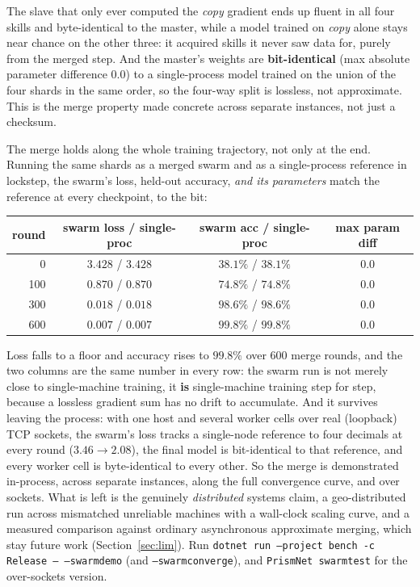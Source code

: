 \documentclass[11pt]{article}
\newcommand{\code}[1]{\texttt{#1}}
\begin{document}
The slave that only ever computed the \emph{copy} gradient ends up fluent in all four skills and
byte-identical to the master, while a model trained on \emph{copy} alone stays near chance on the other
three: it acquired skills it never saw data for, purely from the merged step. And the master's weights are
\textbf{bit-identical} (max absolute parameter difference $0.0$) to a single-process model trained on the
union of the four shards in the same order, so the four-way split is lossless, not approximate. This is
the merge property made concrete across separate instances, not just a checksum.

The merge holds along the whole training trajectory, not only at the end. Running the same shards as a
merged swarm and as a single-process reference in lockstep, the swarm's loss, held-out accuracy, \emph{and
its parameters} match the reference at every checkpoint, to the bit:

\begin{center}
\begin{tabular}{@{}rccc@{}}
\toprule
round & swarm loss / single-proc & swarm acc / single-proc & max param diff \\
\midrule
0   & $3.428$ / $3.428$ & $38.1\%$ / $38.1\%$ & $0.0$ \\
100 & $0.870$ / $0.870$ & $74.8\%$ / $74.8\%$ & $0.0$ \\
300 & $0.018$ / $0.018$ & $98.6\%$ / $98.6\%$ & $0.0$ \\
600 & $0.007$ / $0.007$ & $99.8\%$ / $99.8\%$ & $0.0$ \\
\bottomrule
\end{tabular}
\end{center}

Loss falls to a floor and accuracy rises to $99.8\%$ over $600$ merge rounds, and the two columns are the
same number in every row: the swarm run is not merely close to single-machine training, it \textbf{is}
single-machine training step for step, because a lossless gradient sum has no drift to accumulate. And it
survives leaving the process: with one host and several worker cells over real (loopback) TCP sockets, the
swarm's loss tracks a single-node reference to four decimals at every round ($3.46\to2.08$), the final
model is bit-identical to that reference, and every worker cell is byte-identical to every other. So the
merge is demonstrated in-process, across separate instances, along the full convergence curve, and over
sockets. What is left is the genuinely \emph{distributed} systems claim, a geo-distributed run across
mismatched unreliable machines with a wall-clock scaling curve, and a measured comparison against ordinary
asynchronous approximate merging, which stay future work (Section~\ref{sec:lim}). Run
\code{dotnet run --project bench -c Release -- --swarmdemo} (and \code{--swarmconverge}), and
\code{PrismNet swarmtest} for the over-sockets version.
\end{document}
